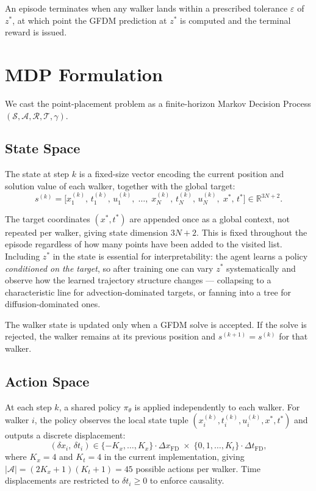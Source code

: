 \documentclass[12pt, a4paper, twoside]{report}
\theoremstyle{plain}
\theoremstyle{definition}
\begin{document}
An episode terminates when any walker lands within a prescribed tolerance $\varepsilon$
of $z^*$, at which point the GFDM prediction at $z^*$ is computed and the terminal
reward is issued.

\section{MDP Formulation}

We cast the point-placement problem as a finite-horizon Markov Decision Process
$(\mathcal{S}, \mathcal{A}, \mathcal{R}, \mathcal{T}, \gamma)$.

\subsection{State Space}

The state at step $k$ is a fixed-size vector encoding the current position and solution
value of each walker, together with the global target:
\begin{equation}
    s^{(k)} = \bigl[x_1^{(k)},\, t_1^{(k)},\, u_1^{(k)},\;
                    \ldots,\;
                    x_N^{(k)},\, t_N^{(k)},\, u_N^{(k)},\;
                    x^*,\, t^*\bigr]
              \in \mathbb{R}^{3N + 2}.
    \label{eq:state}
\end{equation}

The target coordinates $(x^*, t^*)$ are appended once as a global context, not repeated
per walker, giving state dimension $3N + 2$. This is fixed throughout the episode
regardless of how many points have been added to the visited list. Including $z^*$ in the
state is essential for interpretability: the agent learns a policy \emph{conditioned on
the target}, so after training one can vary $z^*$ systematically and observe how the
learned trajectory structure changes --- collapsing to a characteristic line for
advection-dominated targets, or fanning into a tree for diffusion-dominated ones.

The walker state is updated only when a GFDM solve is accepted. If the solve is
rejected, the walker remains at its previous position and $s^{(k+1)} = s^{(k)}$ for that
walker.

\subsection{Action Space}

At each step $k$, a shared policy $\pi_\theta$ is applied independently to each walker.
For walker $i$, the policy observes the local state tuple $(x_i^{(k)}, t_i^{(k)},
u_i^{(k)}, x^*, t^*)$ and outputs a discrete displacement:
\begin{equation}
    ({\delta x}_i,\, {\delta t}_i) \in
    \{-K_x, \ldots, K_x\} \cdot \Delta x_{\mathrm{FD}}
    \;\times\;
    \{0, 1, \ldots, K_t\} \cdot \Delta t_{\mathrm{FD}},
    \label{eq:action}
\end{equation}
where $K_x = 4$ and $K_t = 4$ in the current implementation, giving $|\mathcal{A}| =
(2K_x + 1)(K_t + 1) = 45$ possible actions per walker. Time displacements are
restricted to $\delta t_i \geq 0$ to enforce causality.
\end{document}
